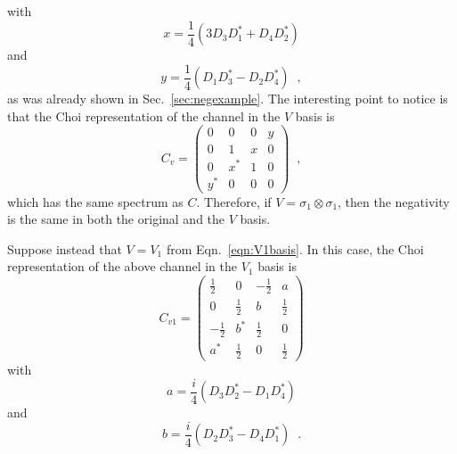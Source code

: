 with
$$
x= \frac{1}{4} \left(3D_3D_1^*+D_4D_2^*\right)
$$
and
$$
y = \frac{1}{4} \left(D_1D_3^*-D_2D_4^*\right)\;\;,
$$
as was already shown in Sec.\ \ref{sec:negexample}.  The interesting point to notice is that the Choi representation of the channel in the $V$ basis is
$$
C_v = \begin{pmatrix}
0&0&0&y\\
0&1&x&0\\
0&x^*&1&0\\
y^*&0&0&0
\end{pmatrix}\;\;,
$$
which has the same spectrum as $C$.  Therefore, if $V=\sigma_1\otimes\sigma_1$, then the negativity is the same in both the original and the $V$ basis.

Suppose instead that $V=V_1$ from Eqn.\ \ref{eqn:V1basis}.  In this case, the Choi representation of the above channel in the $V_1$ basis is
\begin{equation}
\label{eqn:Cbasis}
C_{v1} = \begin{pmatrix}
\frac{1}{2}&0&-\frac{1}{2}&a\\
0&\frac{1}{2}&b&\frac{1}{2}\\
-\frac{1}{2}&b^*&\frac{1}{2}&0\\
a^*&\frac{1}{2}&0&\frac{1}{2}
\end{pmatrix}
\end{equation}
with
$$
a = \frac{i}{4} \left(D_3 D_2^* - D_1 D_4^*\right)
$$
and
$$
b = \frac{i}{4} \left(D_2 D_3^* - D_4 D_1^*\right)\;\;.
$$

